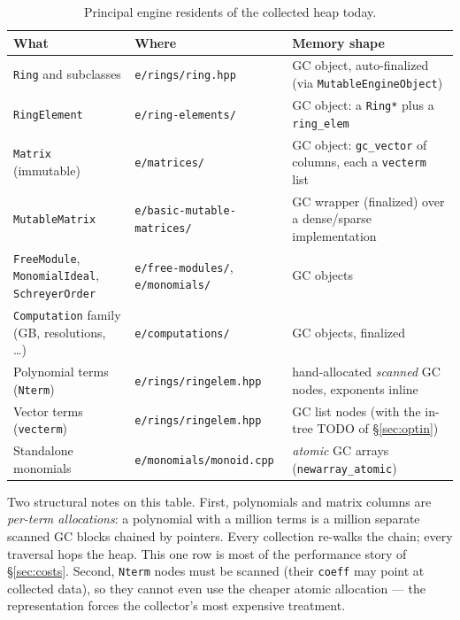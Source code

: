 \documentclass[11pt,oneside]{report}
\newcommand{\code}[1]{\textcolor{m2code}{\texttt{#1}}}
\newcommand{\file}[1]{\textcolor{m2file}{\texttt{#1}}}
\begin{document}
\begin{table}[htbp]
\centering\small
{}
\begin{tabular}{@{}>{\raggedright\arraybackslash}p{}%
                  >{\raggedright\arraybackslash}p{}%
                  >{\raggedright\arraybackslash}p{}@{}}
\toprule
\textbf{What} & \textbf{Where} & \textbf{Memory shape} \\
\midrule
\code{Ring} and subclasses & \file{e/rings/ring.hpp} &
  GC object, auto-finalized (via \code{MutableEngineObject}) \\
\code{RingElement} & \file{e/ring-elements/} &
  GC object: a \code{Ring*} plus a \code{ring\_elem} \\
\code{Matrix} (immutable) & \file{e/matrices/} &
  GC object: \code{gc\_vector} of columns, each a \code{vecterm} list \\
\code{MutableMatrix} & \file{e/basic-mutable-\linebreak matrices/} &
  GC wrapper (finalized) over a dense/sparse implementation \\
\code{FreeModule}, \code{MonomialIdeal}, \code{SchreyerOrder} &
  \file{e/free-modules/}, \file{e/monomials/} & GC objects \\
\code{Computation} family (GB, resolutions, \ldots) &
  \file{e/computations/} & GC objects, finalized \\
Polynomial terms (\code{Nterm}) & \file{e/rings/ringelem.hpp} &
  hand-allocated \emph{scanned} GC nodes, exponents inline \\
Vector terms (\code{vecterm}) & \file{e/rings/ringelem.hpp} &
  GC list nodes (with the in-tree TODO of \S\ref{sec:optin}) \\
Standalone monomials & \file{e/monomials/monoid.cpp} &
  \emph{atomic} GC arrays (\code{newarray\_atomic}) \\
\bottomrule
\end{tabular}
\caption{Principal engine residents of the collected heap today.}
\label{tab:gcside}
\end{table}

Two structural notes on this table. First, polynomials and matrix columns
are \emph{per-term allocations}: a polynomial with a million terms is a
million separate scanned GC blocks chained by pointers. Every collection
re-walks the chain; every traversal hops the heap. This one row is most of
the performance story of \S\ref{sec:costs}. Second, \code{Nterm} nodes must
be scanned (their \code{coeff} may point at collected data), so they cannot
even use the cheaper atomic allocation --- the representation forces the
collector's most expensive treatment.
\end{document}
